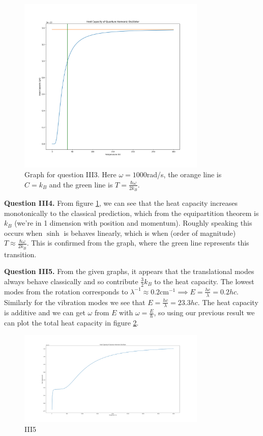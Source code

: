\documentclass[letterpaper, reqno,11pt]{article}
\begin{document}
\begin{figure}[htpb]
    \centering
    \includegraphics[width=0.8\textwidth]{III3}
    \caption{Graph for question III3. Here $\omega=1000$rad/s, the orange line is $C=k_B$ and the green line is $T=\frac{\hbar\omega}{2k_B}$.}
    \label{fig:III3}
\end{figure}

{\medskip\noindent\bf Question III4.} From figure \ref{fig:III3}, we can see that the heat capacity increases monotonically to the classical prediction, which from the equipartition theorem is $k_B$ (we're in 1 dimension with position and momentum). Roughly speaking this occurs when $\sinh$ is behaves linearly, which is when (order of magnitude) $T\approx \frac{\hbar\omega}{2k_B}$. This is confirmed from the graph, where the green line represents this transition.

{\medskip\noindent\bf Question III5.} From the given graphs, it appears that the translational modes always behave classically and so contribute $\frac{3}{2}k_B$ to the heat capacity. The lowest modes from the rotation corresponds to $\lambda^{-1}\approx 0.2\text{cm}^{-1}\implies E=\frac{hc}{\lambda}=0.2hc$. Similarly for the vibration modes we see that $E=\frac{hc}{\lambda}=23.3hc$. The heat capacity is additive and we can get $\omega$ from $E$ with $\omega=\frac{E}{\hbar}$, so using our previous result we can plot the total heat capacity in figure \ref{fig:III5}.

\begin{figure}[htpb]
  \centering
  \includegraphics[width=0.8\textwidth]{III5}
  \caption{III5}
  \label{fig:III5}
\end{figure}
\end{document}
